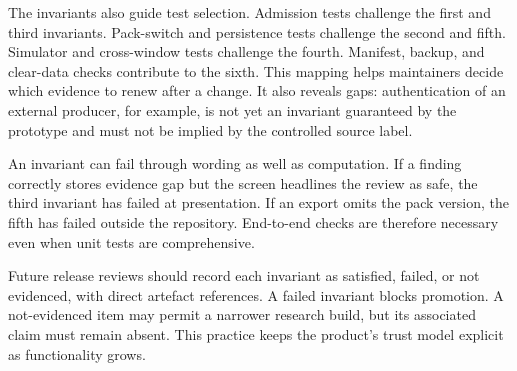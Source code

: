 The invariants also guide test selection. Admission tests challenge the first and third invariants. Pack-switch and persistence tests challenge the second and fifth. Simulator and cross-window tests challenge the fourth. Manifest, backup, and clear-data checks contribute to the sixth. This mapping helps maintainers decide which evidence to renew after a change. It also reveals gaps: authentication of an external producer, for example, is not yet an invariant guaranteed by the prototype and must not be implied by the controlled source label.

An invariant can fail through wording as well as computation. If a finding correctly stores evidence gap but the screen headlines the review as safe, the third invariant has failed at presentation. If an export omits the pack version, the fifth has failed outside the repository. End-to-end checks are therefore necessary even when unit tests are comprehensive.

Future release reviews should record each invariant as satisfied, failed, or not evidenced, with direct artefact references. A failed invariant blocks promotion. A not-evidenced item may permit a narrower research build, but its associated claim must remain absent. This practice keeps the product's trust model explicit as functionality grows.


